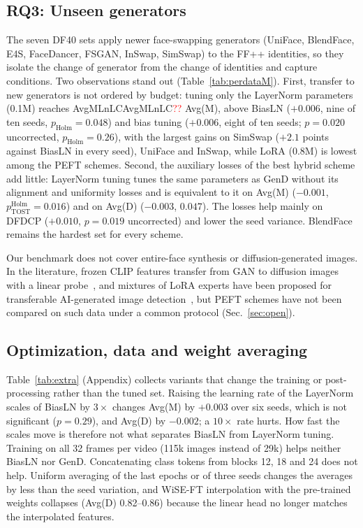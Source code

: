 \documentclass[fonts]{icst}
\newcommand{\num}[1]{\ifcsname #1\endcsname\csname #1\endcsname\else\textcolor{red}{??}\fi}
\begin{document}
\subsection{RQ3: Unseen generators}
\label{sec:rq3}
The seven DF40 sets apply newer face-swapping generators (UniFace, BlendFace, E4S, FaceDancer, FSGAN, InSwap, SimSwap) to the FF++ identities, so they isolate the change of generator from the change of identities and capture conditions. Two observations stand out (Table~\ref{tab:perdataM}). First, transfer to new generators is not ordered by budget: tuning only the LayerNorm parameters (0.1M) reaches \num{AvgMLnLC} Avg(M), above BiasLN ($+0.006$, nine of ten seeds, $p_{\mathrm{Holm}}=0.048$) and bias tuning ($+0.006$, eight of ten seeds; $p=0.020$ uncorrected, $p_{\mathrm{Holm}}=0.26$), with the largest gains on SimSwap ($+2.1$ points against BiasLN in every seed), UniFace and InSwap, while LoRA (0.8M) is lowest among the PEFT schemes. Second, the auxiliary losses of the best hybrid scheme add little: LayerNorm tuning tunes the same parameters as GenD without its alignment and uniformity losses and is equivalent to it on Avg(M) ($-0.001$, $p^{\mathrm{Holm}}_{\mathrm{TOST}}=0.016$) and on Avg(D) ($-0.003$, $0.047$). The losses help mainly on DFDCP ($+0.010$, $p=0.019$ uncorrected) and lower the seed variance. BlendFace remains the hardest set for every scheme.

Our benchmark does not cover entire-face synthesis or diffusion-generated images. In the literature, frozen CLIP features transfer from GAN to diffusion images with a linear probe~\cite{ojha2023universal}, and mixtures of LoRA experts have been proposed for transferable AI-generated image detection~\cite{liu2024mole}, but PEFT schemes have not been compared on such data under a common protocol (Sec.~\ref{sec:open}).

\subsection{Optimization, data and weight averaging}
\label{sec:extra}
Table~\ref{tab:extra} (Appendix) collects variants that change the training or post-processing rather than the tuned set. Raising the learning rate of the LayerNorm scales of BiasLN by $3\times$ changes Avg(M) by $+0.003$ over six seeds, which is not significant ($p=0.29$), and Avg(D) by $-0.002$; a $10\times$ rate hurts. How fast the scales move is therefore not what separates BiasLN from LayerNorm tuning. Training on all 32 frames per video (115k images instead of 29k) helps neither BiasLN nor GenD. Concatenating class tokens from blocks 12, 18 and 24 does not help. Uniform averaging of the last epochs or of three seeds changes the averages by less than the seed variation, and WiSE-FT interpolation with the pre-trained weights collapses (Avg(D) 0.82--0.86) because the linear head no longer matches the interpolated features.
\end{document}

